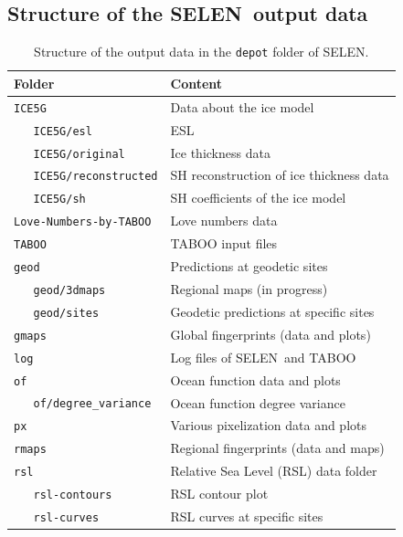 \documentclass[11pt,fleqn,a4paper,titlepage]{article}
\newcommand\selen{\textsf{SELEN~}}
\newcommand\selens{\textsf{SELEN}}
\begin{document}
\subsection{Structure of the \selen output data}
\begin{table}[!hbp] 
\begin{center}
\caption[{\selen output data}]{Structure of the output data in the \texttt{depot} folder of \selens.}
\begin{tabular}{ll}
\\
\hline
{Folder} & Content   \\
\hline
\texttt{ICE5G}                     & Data about the ice model\\[0.0em]
\texttt{~~~ICE5G/esl}                     & ESL \\[0.0em]
\texttt{~~~ICE5G/original}                     & Ice thickness data \\[0.0em]
\texttt{~~~ICE5G/reconstructed}                     & SH reconstruction of ice thickness data\\[0.0em]
\texttt{~~~ICE5G/sh}                     & SH coefficients of the ice model \\[0.0em]
\texttt{Love-Numbers-by-TABOO}            & Love numbers data\\[0.0em]
\texttt{TABOO}   & TABOO input files \\[0.0em]
\texttt{geod}   & Predictions at geodetic sites\\[0.0em]
\texttt{~~~geod/3dmaps}   & Regional maps (in progress) \\[0.0em]
\texttt{~~~geod/sites}   & Geodetic predictions at specific sites \\[0.0em]
\texttt{gmaps}   & Global fingerprints (data and plots) \\[0.0em]
\texttt{log}   & Log files of \selen and TABOO \\[0.0em]
\texttt{of}   & Ocean function data and plots \\[0.0em]
\texttt{~~~of/degree\_variance}   & Ocean function degree variance \\[0.0em]
\texttt{px}   & Various pixelization data and plots \\[0.0em]
\texttt{rmaps}   & Regional fingerprints (data and maps) \\[0.0em]
\texttt{rsl}   & Relative Sea Level (RSL) data folder \\[0.0em]
\texttt{~~~rsl-contours} & RSL contour plot \\[0.0em]
\texttt{~~~rsl-curves} & RSL curves at specific sites \\[0.0em]

\end{tabular}
\end{center}
\end{table}
\end{document}
